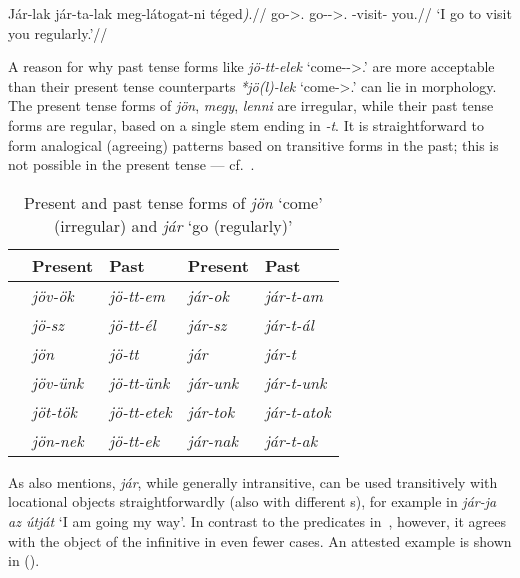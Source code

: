 \ex
    \begingl
        \gla 	Jár-lak \nogloss{/} jár-ta-lak meg-látogat-ni \nogloss{(}téged\emph{)}.//
        \glb 	go-\Fsg>\Second.\Obj{} go-\Pst-\Fsg>\Second.\Obj{} \Vm-visit-\Inf{} you.\Acc//
        \glft 	\enquote*{I go to visit you regularly.}//
    \endgl
\xe

A reason for why past tense forms like \emph{jö-tt-elek}
\enquote*{come-\Pst-\Fsg>\Second.\Obj} are more acceptable than their present
tense counterparts \emph{*jö(l)-lek} \enquote*{come-\Fsg>\Second.\Obj} can lie
in morphology. The present tense forms of \emph{jön}, \emph{megy}, \emph{lenni}
are irregular, while their past tense forms are regular, based on a single stem
ending in \emph{-t}. It is straightforward to form analogical (agreeing)
patterns based on transitive forms in the past; this is not possible in the
present tense --- cf.~.

\begin{table}[h!]%
    \centering
    \begin{tabular}{lllll}
    \toprule
              & Present        & Past              & Present       & Past \\
    \midrule
    \Fsg{} & \emph{jöv-ök}  & \emph{jö-tt-em}   & \emph{jár-ok}  & \emph{jár-t-am} \\
    \Ssg{} & \emph{jö-sz}   & \emph{jö-tt-él}   & \emph{jár-sz}  & \emph{jár-t-ál} \\
    \Tsg{} & \emph{jön}     & \emph{jö-tt}      & \emph{jár}     & \emph{jár-t} \\
    \Fpl{} & \emph{jöv-ünk} & \emph{jö-tt-ünk}  & \emph{jár-unk} & \emph{jár-t-unk} \\
    \Spl{} & \emph{jöt-tök} & \emph{jö-tt-etek} & \emph{jár-tok} & \emph{jár-t-atok} \\
    \Tpl{} & \emph{jön-nek} & \emph{jö-tt-ek}   & \emph{jár-nak} & \emph{jár-t-ak} \\
    \bottomrule
    \end{tabular}
    \caption{Present and past tense forms of \emph{jön} \enquote*{come}
    (irregular) and \emph{jár} \enquote*{go (regularly)}}\label{tb:jon-prs-pst}
\end{table}

As \textcite{denDikken2004} also mentions, \emph{jár}, while generally
intransitive, can be used transitively with locational objects
straightforwardly (also with different \Vm{}s), for example in \emph{jár-ja az
útját} \enquote*{I am going my way}.
%
In contrast to the predicates in~, however, it agrees with the
object of the infinitive in even fewer cases. An attested example is shown in
(\nextx).

